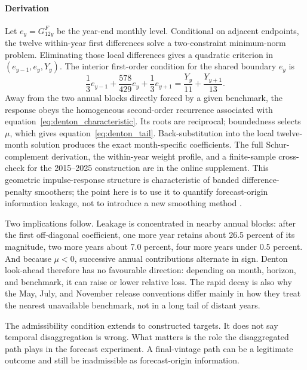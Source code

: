 \documentclass[preprint,12pt,authoryear]{elsarticle}
\begin{document}
\paragraph{Derivation}
Let $e_y = G^F_{12y}$ be the year-end monthly level. Conditional on adjacent
endpoints, the twelve within-year first differences solve a two-constraint
minimum-norm problem. Eliminating those local differences gives a quadratic
criterion in $(e_{y-1}, e_y, Y_y)$. The interior first-order condition for the
shared boundary $e_y$ is
\begin{equation}
\frac{1}{3} e_{y-1} + \frac{578}{429} e_y + \frac{1}{3} e_{y+1}
= \frac{Y_y}{11} + \frac{Y_{y+1}}{13}.
\label{eq:denton_boundary_recursion}
\end{equation}
Away from the two annual blocks directly forced by a given benchmark, the
response obeys the homogeneous second-order recurrence associated with
equation~\eqref{eq:denton_characteristic}. Its roots are reciprocal;
boundedness selects $\mu$, which gives equation~\eqref{eq:denton_tail}.
Back-substitution into the local twelve-month solution produces the exact
month-specific coefficients. The full Schur-complement derivation, the
within-year weight profile, and a finite-sample cross-check for the 2015--2025
construction are in the online supplement. This geometric impulse-response
structure is characteristic of banded difference-penalty smoothers; the point
here is to use it to quantify forecast-origin information leakage, not to
introduce a new smoothing method \citep{eilers2003}.

Two implications follow. Leakage is concentrated in nearby annual blocks:
after the first off-diagonal coefficient, one more year retains about 26.5
percent of its magnitude, two more years about 7.0 percent, four more years
under 0.5 percent. And because $\mu < 0$, successive annual contributions
alternate in sign. Denton look-ahead therefore has no favourable direction:
depending on month, horizon, and benchmark, it can raise or lower relative
loss. The rapid decay is also why the May, July, and November release
conventions differ mainly in how they treat the nearest unavailable benchmark,
not in a long tail of distant years.

The admissibility condition extends \citet{croushorestark2001} to constructed
targets. It does not say temporal disaggregation is wrong. What matters is the
role the disaggregated path plays in the forecast experiment. A final-vintage
path can be a legitimate outcome and still be inadmissible as forecast-origin
information.
\end{document}
